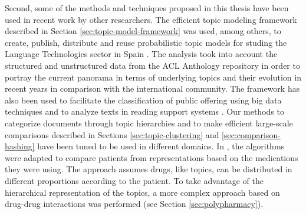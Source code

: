 Second, some of the methods and techniques proposed in this thesis have been used in recent work by other researchers. The efficient topic modeling framework described in Section \ref{sec:topic-model-framework} was used, among others, to create, publish, distribute and reuse probabilistic topic models for studing the Language Technologies sector in Spain \citep{Samy2019}. The analysis took into account the structured and unstructured data from the ACL Anthology repository in order to portray the current panorama in terms of underlying topics and their evolution in recent years in comparison with the international community. The framework has also been used to facilitate the classification of public offering using big data techniques \citep{Olga2019} and to analyze texts in reading support systems \citep{Teresa2020}. Our methods to categorize documents through topic hierarchies and to make efficient large-scale comparisons described in Sections \ref{sec:topic-clustering} and \ref{sec:comparison-hashing} have been tuned to be used in different domains. In \citep{Badenes-Olmedo2019c}, the algorithms were adapted to compare patients from representations based on the medications they were using. The approach assumes drugs, like topics, can be distributed in different proportions according to the patient. To take advantage of the hierarchical representation of the topics, a more complex approach based on drug-drug interactions was performed (see Section \ref{sec:polypharmacy}).

